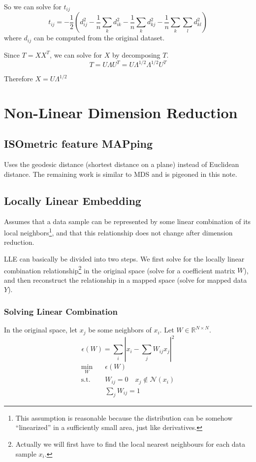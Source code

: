     So we can solve for $t_{ij}$
    \[ t_{ij} = -\frac{1}{2}\left(d_{ij}^2-\frac{1}{n}\sum_kd_{ik}^2-\frac{1}{n}\sum_kd_{kj}^2-\frac{1}{n}\sum_{k}\sum_{l}d_{kl}^2\right) \]
    where $d_{ij}$ can be computed from the original dataset.

    Since $T=XX^T$, we can solve for $X$ by decomposing $T$.
    \[T = U\Lambda U^T = U\Lambda^{1/2}\Lambda^{1/2}U^T\]

    Therefore $X=U\Lambda^{1/2}$


\section{Non-Linear Dimension Reduction}
    \subsection{ISOmetric feature MAPping}
        Uses the geodesic distance (shortest distance on a plane) instead of Euclidean distance. The remaining work is similar to MDS and is pigeoned in this note.

    \subsection{Locally Linear Embedding}
        Assumes that a data sample can be represented by some linear combination of its local neighbors\footnote{This assumption is reasonable because the distribution can be somehow ``linearized'' in a sufficiently small area, just like derivatives.}, and that this relationship does not change after dimension reduction.

        LLE can basically be divided into two steps. We first solve for the locally linear combination relationship\footnote{Actually we will first have to find the local nearest neighbours for each data sample $x_i$.} in the original space (solve for a coefficient matrix $W$), and then reconstruct the relationship in a mapped space (solve for mapped data $Y$).

        \subsubsection{Solving Linear Combination}
        In the original space, let $x_j$ be some neighbors of $x_i$. Let $W \in \mathbb{R}^{N \times N}$.
        \[ \epsilon(W) = \sum_i \left|x_i - \sum_jW_{ij}x_j\right|^2 \]
        \begin{align*}
            \min_W &\quad \epsilon(W)\\
            \text{s.t.} &\quad W_{ij} = 0 \quad x_j \notin \mathcal{N}(x_i)\\
            &\quad \sum_j W_{ij}=1
        \end{align*}

